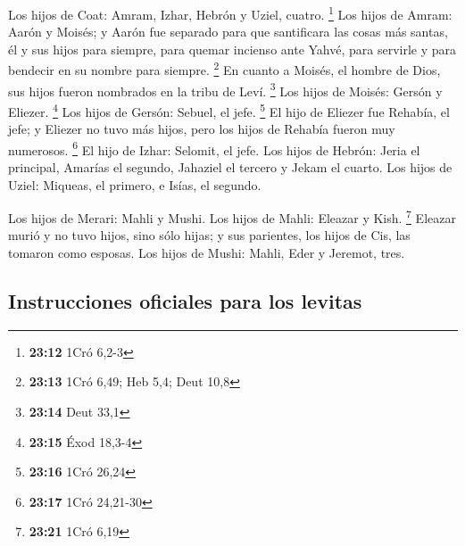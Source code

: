  Los hijos de Coat: Amram, Izhar, Hebrón y Uziel, cuatro.
\footnote{\textbf{23:12} 1Cró 6,2-3}  Los hijos de Amram:
Aarón y Moisés; y Aarón fue separado para que santificara las cosas más
santas, él y sus hijos para siempre, para quemar incienso ante Yahvé,
para servirle y para bendecir en su nombre para siempre. \footnote{\textbf{23:13}
  1Cró 6,49; Heb 5,4; Deut 10,8}  En cuanto a Moisés, el
hombre de Dios, sus hijos fueron nombrados en la tribu de Leví.
\footnote{\textbf{23:14} Deut 33,1}  Los hijos de Moisés:
Gersón y Eliezer. \footnote{\textbf{23:15} Éxod 18,3-4} 
Los hijos de Gersón: Sebuel, el jefe. \footnote{\textbf{23:16} 1Cró
  26,24}  El hijo de Eliezer fue Rehabía, el jefe; y
Eliezer no tuvo más hijos, pero los hijos de Rehabía fueron muy
numerosos. \footnote{\textbf{23:17} 1Cró 24,21-30}  El
hijo de Izhar: Selomit, el jefe.  Los hijos de Hebrón:
Jeria el principal, Amarías el segundo, Jahaziel el tercero y Jekam el
cuarto.  Los hijos de Uziel: Miqueas, el primero, e
Isías, el segundo.

 Los hijos de Merari: Mahli y Mushi. Los hijos de Mahli:
Eleazar y Kish. \footnote{\textbf{23:21} 1Cró 6,19} 
Eleazar murió y no tuvo hijos, sino sólo hijas; y sus parientes, los
hijos de Cis, las tomaron como esposas.  Los hijos de
Mushi: Mahli, Eder y Jeremot, tres.

\hypertarget{instrucciones-oficiales-para-los-levitas}{%
\subsection{Instrucciones oficiales para los
levitas}\label{instrucciones-oficiales-para-los-levitas}}

